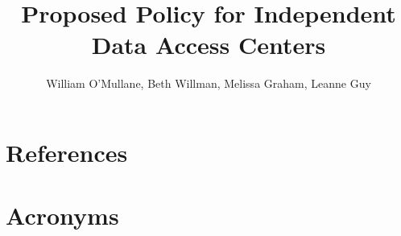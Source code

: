 \documentclass[LPM,lsstdraft]{lsstdoc}
\title[Independent DACs]{Proposed Policy for Independent Data Access Centers}
\author   {William O'Mullane, Beth Willman, Melissa Graham, Leanne Guy }
\begin{document}
%
%
\maketitle

\renewcommand{\thepage}{\arabic{page}}%

\setcounter{page}{1}%
%
%



%



\section{References\label{sect:references}}
\renewcommand{\refname}{}


\section{Acronyms}
\end{document}
